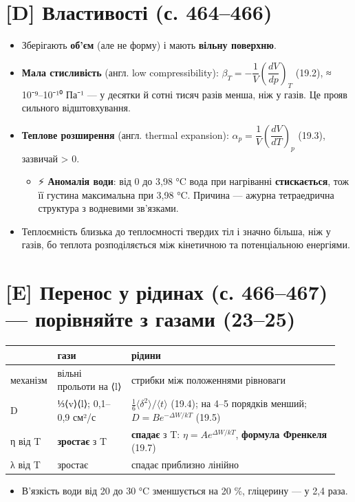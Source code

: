 \documentclass[11pt,a4paper,oneside]{book}
\newcommand{\spark}{{\sffamily\color{warncol}⚡}}
\begin{document}
\section*{[D] Властивості (с. 464–466)}
\begin{itemize}
\item Зберігають \textbf{об'єм} (але не форму) і мають \textbf{вільну поверхню}.
\item \textbf{Мала стисливість} (англ. low compressibility): $\beta_T = -\dfrac1V\left(\dfrac{dV}{dp}\right)_T$ (19.2), ≈ 10⁻⁹–10⁻¹⁰ Па⁻¹ — у десятки й сотні тисяч разів менша, ніж у газів. Це прояв сильного відштовхування.
\item \textbf{Теплове розширення} (англ. thermal expansion): $\alpha_p = \dfrac1V\left(\dfrac{dV}{dT}\right)_p$ (19.3), зазвичай > 0.
\begin{itemize}
\item \spark{} \textbf{Аномалія води}: від 0 до 3,98 °C вода при нагріванні \textbf{стискається}, тож її густина максимальна при 3,98 °C. Причина — ажурна тетраедрична структура з водневими зв'язками.
\end{itemize}
\item Теплоємність близька до теплоємності твердих тіл і значно більша, ніж у газів, бо теплота розподіляється між кінетичною та потенціальною енергіями.
\end{itemize}

\section*{[E] Перенос у рідинах (с. 466–467) — порівняйте з газами (23–25)}
{\small
\begin{longtable}{>{\raggedright\arraybackslash}p{0.104\linewidth}>{\raggedright\arraybackslash}p{0.228\linewidth}>{\raggedright\arraybackslash}p{0.620\linewidth}}
\toprule
\textbf{} & \textbf{гази} & \textbf{рідини} \\
\midrule
\endhead
механізм & вільні прольоти на ⟨l⟩ & стрибки між положеннями рівноваги \\
D & ⅓⟨v⟩⟨l⟩; 0,1–0,9 см²/с & $\tfrac16\langle\delta^2\rangle/\langle t\rangle$ (19.4); на 4–5 порядків менший; $D = Be^{-\Delta W/kT}$ (19.5) \\
η від T & \textbf{зростає} з T & \textbf{спадає} з T: $\eta = Ae^{\Delta W/kT}$, \textbf{формула Френкеля} (19.7) \\
λ від T & зростає & спадає приблизно лінійно \\
\bottomrule
\end{longtable}
}
\begin{itemize}
\item В'язкість води від 20 до 30 °C зменшується на 20 \%, гліцерину — у 2,4 раза.
\end{itemize}
\end{document}
